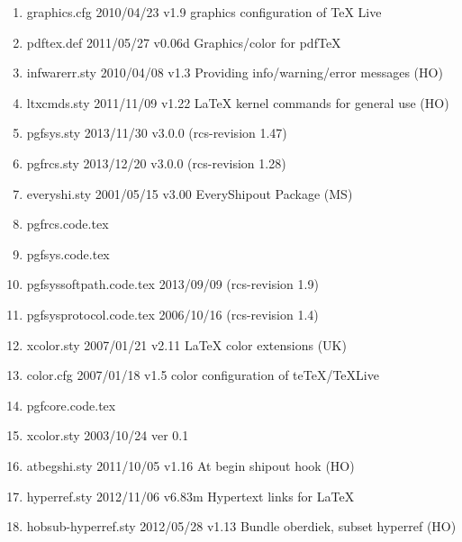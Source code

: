 \begin{enumerate}
\item graphics.cfg 2010/04/23 v1.9 graphics configuration of TeX Live
\item pdftex.def 2011/05/27 v0.06d Graphics/color for pdfTeX
\item infwarerr.sty 2010/04/08 v1.3 Providing info/warning/error messages (HO)
\item ltxcmds.sty 2011/11/09 v1.22 LaTeX kernel commands for general use (HO)
\item pgfsys.sty 2013/11/30 v3.0.0 (rcs-revision 1.47)
\item pgfrcs.sty 2013/12/20 v3.0.0 (rcs-revision 1.28)
\item everyshi.sty 2001/05/15 v3.00 EveryShipout Package (MS)
\item pgfrcs.code.tex
\item pgfsys.code.tex
\item pgfsyssoftpath.code.tex 2013/09/09 (rcs-revision 1.9)
\item 		 pgfsysprotocol.code.tex 2006/10/16 (rcs-revision 1.4)
\item 		 xcolor.sty 2007/01/21 v2.11 LaTeX color extensions (UK)
\item 		 color.cfg 2007/01/18 v1.5 color configuration of teTeX/TeXLive
\item 		 pgfcore.code.tex
\item 	xcolor.sty 2003/10/24 ver 0.1
\item 		 atbegshi.sty 2011/10/05 v1.16 At begin shipout hook (HO)
\item 		 hyperref.sty 2012/11/06 v6.83m Hypertext links for LaTeX
\item hobsub-hyperref.sty 2012/05/28 v1.13 Bundle oberdiek, subset hyperref (HO)

\end{enumerate}
